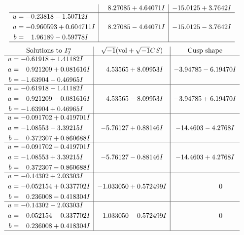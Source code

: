 \documentclass[1p]{elsarticle_modified}
\theoremstyle{definition}
\newcommand{\I}{\sqrt{-1}}
\begin{document}
$$\begin{array}{c|c|c}
 & \phantom{-}8.27085 + 4.64071 I & -15.0125 + 3.7642 I \\ \hline\begin{aligned}
u &= -0.23818 - 1.50712 I \\
a &= -0.960593 + 0.604711 I \\
b &= \phantom{-}1.96189 - 0.59778 I\end{aligned}
 & \phantom{-}8.27085 - 4.64071 I & -15.0125 - 3.7642 I\\
 \hline 
 \end{array}$$\newpage$$\begin{array}{c|c|c}  
\text{Solutions to }I^u_{2}& \I (\text{vol} + \sqrt{-1}CS) & \text{Cusp shape}\\
 \hline 
\begin{aligned}
u &= -0.61918 + 1.41182 I \\
a &= \phantom{-}0.921209 + 0.081616 I \\
b &= -1.63904 - 0.46965 I\end{aligned}
 & \phantom{-}4.53565 + 8.09953 I & -3.94785 - 6.19470 I \\ \hline\begin{aligned}
u &= -0.61918 - 1.41182 I \\
a &= \phantom{-}0.921209 - 0.081616 I \\
b &= -1.63904 + 0.46965 I\end{aligned}
 & \phantom{-}4.53565 - 8.09953 I & -3.94785 + 6.19470 I \\ \hline\begin{aligned}
u &= -0.091702 + 0.419701 I \\
a &= -1.08553 - 3.39215 I \\
b &= \phantom{-}0.372307 + 0.860688 I\end{aligned}
 & -5.76127 + 0.88146 I & -14.4603 - 4.2768 I \\ \hline\begin{aligned}
u &= -0.091702 - 0.419701 I \\
a &= -1.08553 + 3.39215 I \\
b &= \phantom{-}0.372307 - 0.860688 I\end{aligned}
 & -5.76127 - 0.88146 I & -14.4603 + 4.2768 I \\ \hline\begin{aligned}
u &= -0.14302 + 2.03303 I \\
a &= -0.052154 + 0.337702 I \\
b &= \phantom{-}0.236008 - 0.418304 I\end{aligned}
 & -1.033050 + 0.572499 I & \phantom{-0.000000 } 0 \\ \hline\begin{aligned}
u &= -0.14302 - 2.03303 I \\
a &= -0.052154 - 0.337702 I \\
b &= \phantom{-}0.236008 + 0.418304 I\end{aligned}
 & -1.033050 - 0.572499 I & \phantom{-0.000000 } 0\\
 \hline 
 \end{array}$$\newpage
\end{document}
